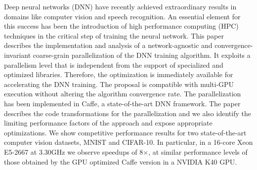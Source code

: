 Deep neural networks (DNN) have recently achieved extraordinary
results in domains like computer vision and speech recognition.
An essential element for this success
has been the introduction of high performance computing (HPC)
techniques in the critical step of training the neural network. 
This paper describes the implementation and
analysis of a network-agnostic and convergence-invariant
coarse-grain parallelization of the DNN training algorithm.
It exploits a parallelism level that is independent from the
support of specialized and optimized libraries. Therefore, the
optimization is immediately available for accelerating the DNN
training. The proposal is compatible with multi-GPU execution without
altering the algorithm convergence rate. The parallelization has
been implemented in Caffe, a state-of-the-art DNN framework.
The paper describes the code transformations for the parallelization
and we also identify the limiting performance factors of the
approach and expose appropriate optimizations. We show competitive
performance results for two state-of-the-art computer vision
datasets, MNIST and CIFAR-10. In particular, in a 16-core Xeon E5-2667
at 3.30GHz we observe speedups of 8$\times$, at similar performance levels
of those obtained by the GPU optimized Caffe version in a NVIDIA K40 GPU.


